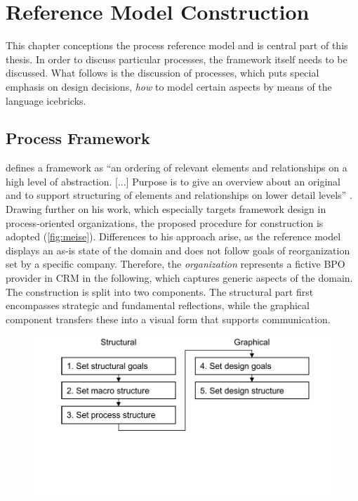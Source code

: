 
\chapter{Reference Model Construction}

This chapter conceptions the process reference model and is central part of this thesis. In order to discuss particular processes, the framework itself needs to be discussed. What follows is the discussion of processes, which puts special emphasis on design decisions, \viz \textit{how} to model certain aspects by means of the language icebricks. 


	\section{Process Framework}
	
	\citeauthor{Meise2001} defines a framework as \enquote{an ordering of relevant elements and relationships on a high level of abstraction. [...] Purpose is to give an overview about an original and to support structuring of elements and relationships on lower detail levels} \citep[]{Meise2001}. Drawing further on his work, which especially targets framework design in process-oriented organizations, the proposed procedure for construction is adopted (\Fig \ref{fig:meise}). Differences to his approach arise, as the reference model displays an as-is state of the domain and does not follow goals of reorganization set by a specific company. Therefore, the \textit{organization} represents a fictive BPO provider in CRM in the following, which captures generic aspects of the domain. The construction is split into two components. The structural part first encompasses strategic and fundamental reflections, while the graphical component transfers these into a visual form that supports communication.

	\begin{figure}[caption={Procedure for framework construction}, label={fig:meise}]
		{	\includegraphics[width=.8\textwidth]{figures/framework-meise.pdf}}
		\parbox{0.7\textwidth }{}
	\end{figure} 
	
